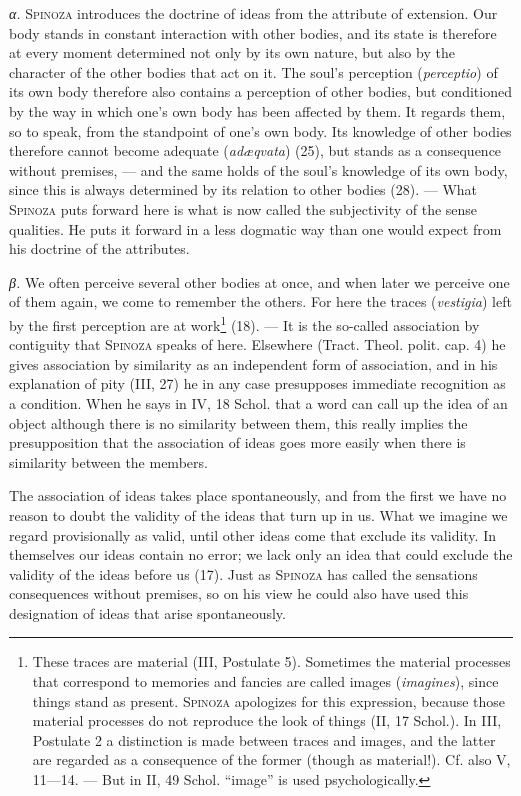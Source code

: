 \documentclass[12pt]{article}
\begin{document}
\textit{α.} \textsc{Spinoza} introduces the doctrine of ideas from the attribute of
extension. Our body stands in constant interaction with other bodies, and its state is
therefore at every moment determined not only by its own nature, but also by the character
of the other bodies that act on it. The soul's perception (\textit{perceptio}) of its own
body therefore also contains a perception of other bodies, but conditioned by the way in
which one's own body has been affected by them. It regards them, so to speak, from the
standpoint of one's own body. Its knowledge of other bodies therefore cannot become adequate
(\textit{adæqvata}) (25), but stands as a consequence without premises, --- and the same
holds of the soul's knowledge of its own body, since this is always determined by its
relation to other bodies (28). --- What \textsc{Spinoza} puts forward here is what is now
called the subjectivity of the sense qualities. He puts it forward in a less dogmatic way
than one would expect from his doctrine of the attributes.

\textit{β.} We often perceive several other bodies at once, and when later we perceive one
of them again, we come to remember the others. For here the traces (\textit{vestigia}) left
by the first perception are at work\footnote{These traces are material (III, Postulate 5).
Sometimes the material processes that correspond to memories and fancies are called images
(\textit{imagines}), since things stand as present. \textsc{Spinoza} apologizes for this
expression, because those material processes do not reproduce the look of things (II, 17
Schol.). In III, Postulate 2 a distinction is made between traces and images, and the latter
are regarded as a consequence of the former (though as material!). Cf. also V, 11---14. ---
But in II, 49 Schol. ``image'' is used psychologically.} (18). --- It is the so-called
association by contiguity that \textsc{Spinoza} speaks of here. Elsewhere (Tract. Theol.
polit. cap. 4) he gives association by similarity as an independent form of association,
and in his explanation of pity (III, 27) he in any case presupposes immediate recognition as
a condition. When he says in IV, 18 Schol. that a word can call up the idea of an object
although there is no similarity between them, this really implies the presupposition that
the association of ideas goes more easily when there is similarity between the members.

The association of ideas takes place spontaneously, and from the first we have no reason to
doubt the validity of the ideas that turn up in us. What we imagine we regard provisionally
as valid, until other ideas come that exclude its validity. In themselves our ideas contain
no error; we lack only an idea that could exclude the validity of the ideas before us (17).
Just as \textsc{Spinoza} has called the sensations consequences without premises, so on his
view he could also have used this designation of ideas that arise spontaneously.
\end{document}
